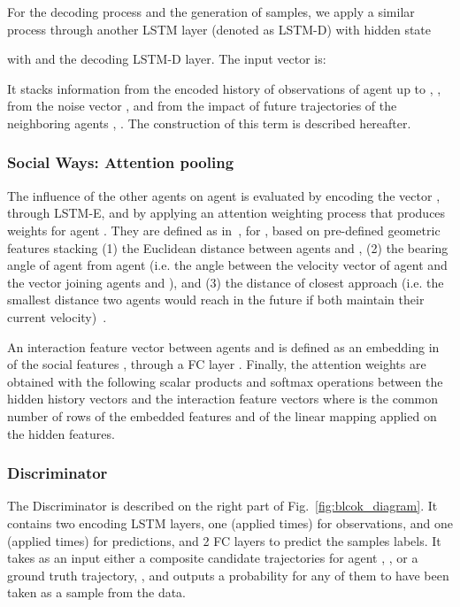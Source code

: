 \documentclass[10pt,twocolumn,letterpaper]{article}
\begin{document}
For the decoding process and the generation of samples, we apply a similar process through another LSTM layer (denoted as LSTM-D) with hidden state 

with  and  the decoding LSTM-D layer. The input vector is:

 
\noindent
It stacks information from the encoded history of observations of agent  up to , , from the noise vector , and from the impact of future trajectories of the neighboring agents , . The construction of this term is described hereafter. 

\subsubsection{Social Ways: Attention pooling}

The influence of the other agents on agent  is evaluated by encoding the vector , through LSTM-E, and by applying an attention weighting process that produces weights  for agent . They are defined as in~\cite{SoPhie2018}, for , based on pre-defined geometric features  stacking (1) the Euclidean distance between agents  and , (2) the bearing angle of agent  from agent  (i.e. the angle between the velocity vector of agent  and the vector joining agents  and ), and (3) the distance of closest approach (i.e. the smallest distance two agents would reach in the future if both maintain their current velocity)~\cite{Kooij2014ContextBasedPP}.

An interaction feature vector between agents  and  is defined as an embedding in  of the social features , through a FC layer . Finally, the attention weights are obtained with the following scalar products and softmax operations between the hidden history vectors  and the interaction feature vectors   
{\small
}
\noindent where  is the common number of rows of the embedded features  and of the linear mapping  applied on the hidden features.


\subsubsection{Discriminator}

The Discriminator is described on the right part of Fig.~\ref{fig:blcok_diagram}. It contains two encoding LSTM layers,  one (applied  times) for observations, and one (applied  times) for predictions, and 2 FC layers to predict the samples labels. It takes as an input either a composite candidate trajectories for agent , , or a ground truth trajectory, , and outputs a probability for any of them to have been taken as a sample from the data.
\end{document}
